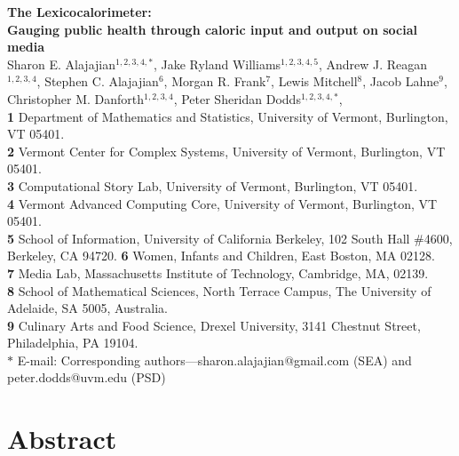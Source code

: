\documentclass[10pt]{article}
\date{}
\begin{document}
\begin{flushleft}
{\Large
\textbf{The Lexicocalorimeter:  \\
Gauging public health through caloric input and output on social media}
}
\bigskip\\
Sharon E. Alajajian$^{1,2,3,4,\ast}$,
Jake Ryland Williams$^{1,2,3,4,5}$,
Andrew J. Reagan$^{1,2,3,4}$,
Stephen C. Alajajian$^{6}$,
Morgan R. Frank$^{7}$,
Lewis Mitchell$^{8}$,
Jacob Lahne$^{9}$,
Christopher M. Danforth$^{1,2,3,4}$,
Peter Sheridan Dodds$^{1,2,3,4,\ast}$, 
\bigskip\\
\textbf{1} Department of Mathematics and Statistics, University of Vermont, Burlington, VT 05401.
\\
\textbf{2} Vermont Center for Complex Systems, University of Vermont, Burlington, VT 05401.
\\
\textbf{3} Computational Story Lab, University of Vermont, Burlington, VT 05401.
\\
\textbf{4} Vermont Advanced Computing Core, University of Vermont,
Burlington, VT 05401.
\\
\textbf{5} School of Information,
University of California Berkeley,
102 South Hall \#4600, Berkeley, CA 94720.
\textbf{6} Women, Infants and Children, East Boston, MA 02128.
\\
\textbf{7} Media Lab, Massachusetts
Institute of Technology, Cambridge, MA, 02139.
\\
\textbf{8} School of Mathematical Sciences, North Terrace Campus, 
The University of Adelaide, SA 5005, Australia.
\\
\textbf{9} Culinary Arts and Food
Science, Drexel University, 3141 Chestnut Street, Philadelphia, PA
19104.
\\
$\ast$ E-mail: Corresponding authors---sharon.alajajian@gmail.com (SEA) and peter.dodds@uvm.edu (PSD)

\end{flushleft}

\section*{Abstract}
\end{document}
